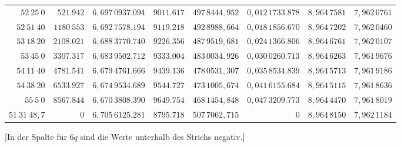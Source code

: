 \begin{center}
\begin{tabular}{|r|r|r|r|r|r|r|r|}
$52\ 25\ 0$&$521.942$&$6{,}697\,0937.094$&$9011.617$&$497\,8444{,}952$&$0{,}012\,1733.878$&$8{,}964\,7581$&$7{,}962\,0761$\\
$52\ 51\ 40$&$1180\ 553$&$6{,}692\,7578.194$&$9119.218$&$492\,8988{,}664$&$0{,}018\,1856.670$&$8{,}964\,7202$&$7{,}962\,0460$\\
$53\ 18\ 20$&$2108.021$&$6{,}688\,3770.740$&$9226.356$&$487\,9519{,}681$&$0{,}024\,1366.806$&$8{,}964\,6761$&$7{,}962\,0107$\\
$53\ 45\ 0$&$3307.317$&$6{,}683\,9502.712$&$9333.004$&$483\,0034{,}926$&$0{,}030\,0260.713$&$8{,}964\,6263$&$7{,}961\,9676$\\
$54\ 11\ 40$&$4781.541$&$6{,}679\,4761.666$&$9439.136$&$478\,0531{,}307$&$0{,}035\,8534.839$&$8{,}964\,5713$&$7{,}961\,9186$\\
$54\ 38\ 20$&$6533.927$&$6{,}674\,9534.689$&$9544.727$&$473\,1005{,}674$&$0{,}041\,6155.684$&$8{,}964\,5115$&$7{,}961\,8636$\\
$55\ 5\ 0$&$8567.844$&$6{,}670\,3808.390$&$9649.754$&$468\,1454{,}848$&$0{,}047\,3209.773$&$8{,}964\,4470$&$7{,}961\,8019$\\[8pt]
$51\ 31\ 48{,}7$&$0$&$6{,}705\,6125.281$&$8795.718$&$507\,7062{,}715$&$0$&$8{,}964\,8150$&$7{,}962\,1184$\\
\end{tabular}\par\endgroup
\end{center}
\noindent{}[In der Spalte für $6q$ sind die Werte unterhalb des Strichs negativ.]
\vspace{12mm}
